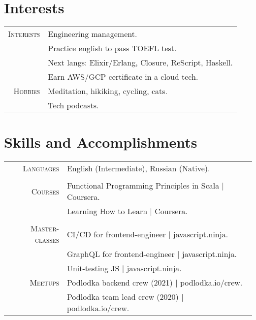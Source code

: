 \documentclass[a4paper,11pt]{article}
\newcommand{\sep}{\multicolumn{2}{c}{}\\}
\begin{document}
\section{Interests}
\begin{tabular}{rl}
  \textsc{Interests}
    &Engineering management.\\
    &Practice english to pass TOEFL test.\\
    &Next langs: Elixir/Erlang, Closure, ReScript, Haskell.\\
    &Earn AWS/GCP certificate in a cloud tech.\\
  \textsc{Hobbies}
    &Meditation, hikiking, cycling, cats. \\
    &Tech podcasts.\\
\end{tabular}

\section{Skills and Accomplishments}
\begin{tabular}{rl}
  \textsc{Languages}& English (Intermediate), Russian (Native).\\\sep
  \textsc{Courses}
    &Functional Programming Principles in Scala | Coursera.\\
    &Learning How to Learn | Coursera.\\\sep
  \textsc{Master-classes}
    &CI/CD for frontend-engineer | javascript.ninja. \\
    &GraphQL for frontend-engineer | javascript.ninja. \\
    &Unit-testing JS | javascript.ninja. \\
  \textsc{Meetups}
    &Podlodka backend crew (2021) | podlodka.io/crew. \\
    &Podlodka team lead crew (2020) | podlodka.io/crew. \\
\end{tabular}
\end{document}
